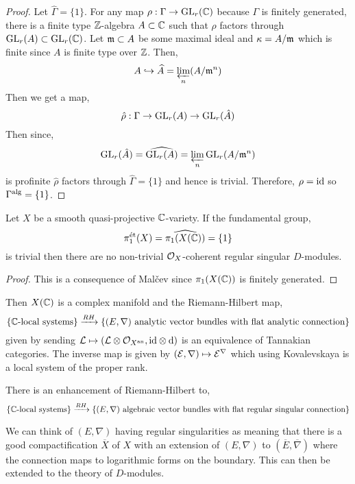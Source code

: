 \documentclass[12pt]{article}
\begin{document}
\begin{proof}
Let $\widehat{\Gamma} = \{ 1 \}$. For any map $\rho : \Gamma \to \mathrm{GL}_r(\mathbb{C})$ because $\Gamma$ is finitely generated, there is a finite type $\mathbb{Z}$-algebra $A \subset \mathbb{C}$ such that $\rho$ factors through $\mathrm{GL}_r(A) \subset \mathrm{GL}_r(\mathbb{C})$. Let $\mathfrak{m} \subset A$ be some maximal ideal and $\kappa = A / \mathfrak{m}$ which is finite since $A$ is finite type over $\mathbb{Z}$. Then,
\[ A \hookrightarrow \widehat{A} = \varprojlim_n (A / \mathfrak{m}^n) \]
Then we get a map,
\[ \hat{\rho} : \Gamma \to \mathrm{GL}_r(A) \to \mathrm{GL}_r(\hat{A}) \]
Then since,
\[ \mathrm{GL}_r(\hat{A}) = \widehat{\mathrm{GL}_r(A)} = \varprojlim_{n} \mathrm{GL}_r(A/\mathfrak{m}^n) \]
is profinite $\hat{\rho}$ factors through $\widehat{\Gamma} = \{ 1 \}$ and hence is trivial. Therefore, $\rho = \mathrm{id}$ so $\Gamma^{\mathrm{alg}} = \{ 1 \}$.  
\end{proof}

\begin{theorem}[Grothendieck]
Let $X$ be a smooth quasi-projective $\mathbb{C}$-variety. If the \etale fundamental group,
\[ \pi_1^{\text{\'{e}t}}(X) = \widehat{\pi_1(X(\mathbb{C}))} = \{ 1 \} \]
is trivial then there are no non-trivial $\mathcal{O}_{X}$-coherent regular singular $D$-modules.
\end{theorem}

\begin{proof}
This is a consequence of Mal\v{c}ev since $\pi_1(X(\mathbb{C}))$ is finitely generated. 
\end{proof}

\begin{rmk}
Then $X(\mathbb{C})$ is a complex manifold and the Riemann-Hilbert map,
\[ \{ \mathbb{C}\text{-local systems} \} \xrightarrow{RH} \{ (E, \nabla) \text{ analytic vector bundles with flat analytic connection} \} \]
given by sending $\mathcal{L} \mapsto (\mathcal{L} \otimes \mathcal{O}_{X^{\mathrm{an}}}, \mathrm{id} \otimes \mathrm{d})$ is an equivalence of Tannakian categories. The inverse map is given by $(\mathcal{E}, \nabla) \mapsto \mathcal{E}^{\nabla}$ which using Kovalevskaya is a local system of the proper rank.
\end{rmk}

\begin{theorem}[Deligne]
There is an enhancement of Riemann-Hilbert to,
\[ \{ \mathbb{C}\text{-local systems} \} \xrightarrow{RH} \{ (E, \nabla) \text{ algebraic vector bundles with flat regular singular connection} \} \]
\end{theorem}

\begin{rmk}
We can think of $(E, \nabla)$ having regular singularities as meaning that there is a good compactification $\overline{X}$ of $X$ with an extension of $(E, \nabla)$ to $(\overline{E}, \overline{\nabla})$ where the connection maps to logarithmic forms on the boundary. This can then be extended to the theory of $D$-modules. 
\end{rmk}
\end{document}
